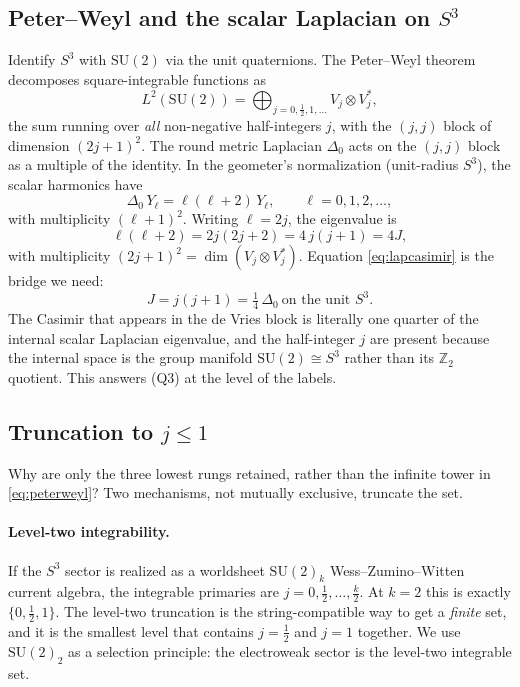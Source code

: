\documentclass[11pt]{article}
\theoremstyle{plain}
\theoremstyle{definition}
\newcommand{\half}{\tfrac12}
\newcommand{\Z}{\mathbb{Z}}
\newcommand{\SU}{\mathrm{SU}}
\begin{document}
\subsection{Peter--Weyl and the scalar Laplacian on $S^3$}

Identify $S^3$ with $\SU(2)$ via the unit quaternions. The Peter--Weyl
theorem decomposes square-integrable functions as
\begin{equation}
L^2(\SU(2))=\bigoplus_{j=0,\frac12,1,\dots}V_j\otimes V_j^{*},
\label{eq:peterweyl}
\end{equation}
the sum running over \emph{all} non-negative half-integers $j$, with the
$(j,j)$ block of dimension $(2j+1)^2$. The round metric Laplacian
$\Delta_0$ acts on the $(j,j)$ block as a multiple of the identity. In the
geometer's normalization (unit-radius $S^3$), the scalar harmonics have
\begin{equation}
\Delta_0\,Y_\ell=\ell(\ell+2)\,Y_\ell,\qquad \ell=0,1,2,\dots,
\end{equation}
with multiplicity $(\ell+1)^2$. Writing $\ell=2j$, the eigenvalue is
\begin{equation}
\ell(\ell+2)=2j(2j+2)=4\,j(j+1)=4J,
\label{eq:lapcasimir}
\end{equation}
with multiplicity $(2j+1)^2=\dim(V_j\otimes V_j^*)$. Equation
\eqref{eq:lapcasimir} is the bridge we need:
\begin{equation}
\boxed{\quad J=j(j+1)=\tfrac14\,\Delta_0\ \text{on the unit }S^3.\quad}
\end{equation}
The Casimir that appears in the de Vries block is literally one quarter of
the internal scalar Laplacian eigenvalue, and the half-integer $j$ are
present because the internal space is the group manifold
$\SU(2)\cong S^3$ rather than its $\Z_2$ quotient. This answers (Q3) at the
level of the labels.

\subsection{Truncation to $j\le1$}

Why are only the three lowest rungs retained, rather than the infinite
tower in \eqref{eq:peterweyl}? Two mechanisms, not mutually exclusive,
truncate the set.

\paragraph{Level-two integrability.} If the $S^3$ sector is realized as a
worldsheet $\SU(2)_k$ Wess--Zumino--Witten current algebra, the integrable
primaries are $j=0,\half,\dots,\tfrac k2$. At $k=2$ this is exactly
$\{0,\half,1\}$. The level-two truncation is the string-compatible way to
get a \emph{finite} set, and it is the smallest level that contains
$j=\half$ and $j=1$ together. We use $\SU(2)_2$ as a selection principle:
the electroweak sector is the level-two integrable set.
\end{document}
